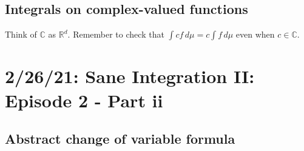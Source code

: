 \documentclass{article}
\newcommand{\C}{\mathbb{C}}
\newcommand{\R}{\mathbb{R}}
\theoremstyle{definition}
\begin{document}
\subsection*{Integrals on complex-valued functions}
Think of $\C$ as $\R^d$. Remember to check that $\int cf\,d\mu = c\int f\,d\mu$ even when $c \in \C$.

\section*{2/26/21: Sane Integration II: Episode 2 - Part ii}

\subsection*{Abstract change of variable formula}
\end{document}
